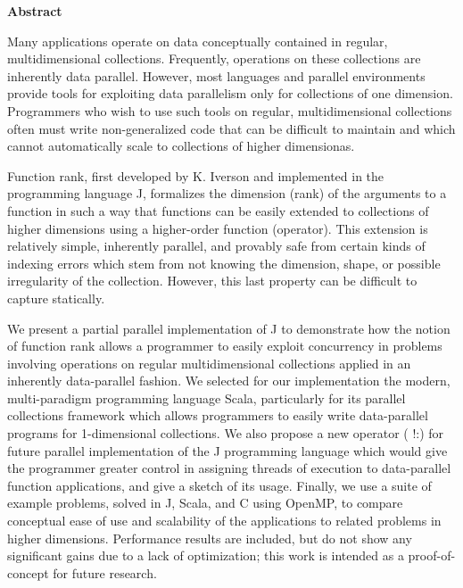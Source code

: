 \begin{center}

\bigskip

\begin{Large}
\textbf{\theTitle}
\end{Large}

\bigskip

\begin{large}
\theAuthor
\end{large}

\bigskip
\bigskip

\textbf{Abstract}

\end{center}

\noindent
Many applications operate on data conceptually contained in regular, multidimensional collections.
Frequently, operations on these collections are inherently data parallel.
However, most languages and parallel environments provide tools for exploiting data parallelism only for collections of one dimension.
Programmers who wish to use such tools on regular, multidimensional collections often must write non-generalized code that can be difficult to maintain and which cannot automatically scale to collections of higher dimensionas.

Function rank, first developed by K. Iverson and implemented in the programming language J, formalizes the dimension (rank) of the arguments to a function in such a way that functions can be easily extended to collections of higher dimensions using a higher-order function (operator).
This extension is relatively simple, inherently parallel, and provably safe from certain kinds of indexing errors which stem from not knowing the dimension, shape, or possible irregularity of the collection.
However, this last property can be difficult to capture statically.

We present a partial parallel implementation of J to demonstrate how the notion of function rank allows a programmer to easily exploit concurrency in problems involving operations on regular multidimensional collections applied in an inherently data-parallel fashion.
We selected for our implementation the modern, multi-paradigm programming language Scala, particularly for its parallel collections framework which allows programmers to easily write data-parallel programs for 1-dimensional collections.
We also propose a new operator ( !:\normalfont) for future parallel implementation of the J programming language which would give the programmer greater control in assigning threads of execution to data-parallel function applications, and give a sketch of its usage.
Finally, we use a suite of example problems, solved in J, Scala, and C using OpenMP, to compare conceptual ease of use and scalability of the applications to related problems in higher dimensions.
Performance results are included, but do not show any significant gains due to a lack of optimization; this work is intended as a proof-of-concept for future research.
